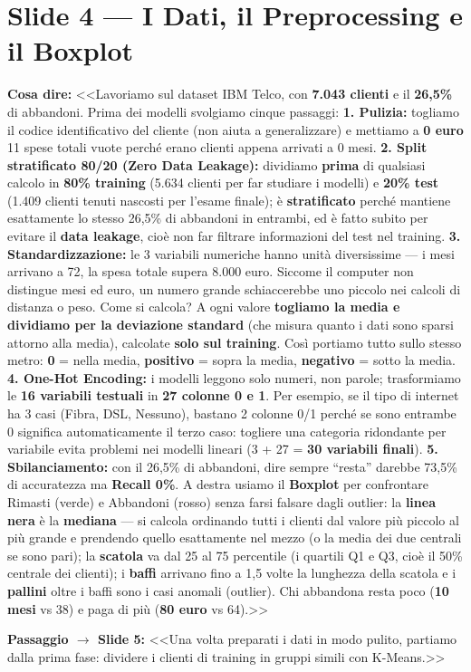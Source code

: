 \documentclass[10pt, a4paper]{article}
\newcommand{\say}[1]{%
  \par\vspace{2pt}\noindent\colorbox{SoftBox}{\parbox{\dimexpr\linewidth-2\fboxsep}{\raggedright\small\textbf{\color{PrimaryNavy}Cosa dire:} #1}}\par\vspace{2pt}%
}
\newcommand{\pass}[2]{%
  \par\vspace{1pt}\noindent\colorbox{PassBox}{\parbox{\dimexpr\linewidth-2\fboxsep}{\raggedright\footnotesize\textbf{\color{AccentAmber}Passaggio $\rightarrow$ Slide #1:} <<#2>>}}\par%
}
\newcommand{\slideblock}[3]{%
  \noindent\begin{minipage}{\linewidth}
    \section*{#1}
    \say{#2}
    #3
  \end{minipage}\par\vspace{6pt}%
}
\begin{document}
\slideblock{Slide 4 --- I Dati, il Preprocessing e il Boxplot}{%
<<Lavoriamo sul dataset IBM Telco, con \textbf{7.043 clienti} e il \textbf{26,5\%} di abbandoni. Prima dei modelli svolgiamo cinque passaggi:
\textbf{1. Pulizia:} togliamo il codice identificativo del cliente (non aiuta a generalizzare) e mettiamo a \textbf{0 euro} 11 spese totali vuote perché erano clienti appena arrivati a 0 mesi.
\textbf{2. Split stratificato 80/20 (Zero Data Leakage):} dividiamo \textbf{prima} di qualsiasi calcolo in \textbf{80\% training} (5.634 clienti per far studiare i modelli) e \textbf{20\% test} (1.409 clienti tenuti nascosti per l'esame finale); è \textbf{stratificato} perché mantiene esattamente lo stesso 26,5\% di abbandoni in entrambi, ed è fatto subito per evitare il \textbf{data leakage}, cioè non far filtrare informazioni del test nel training.
\textbf{3. Standardizzazione:} le 3 variabili numeriche hanno unità diversissime --- i mesi arrivano a 72, la spesa totale supera 8.000 euro. Siccome il computer non distingue mesi ed euro, un numero grande schiaccerebbe uno piccolo nei calcoli di distanza o peso. Come si calcola? A ogni valore \textbf{togliamo la media e dividiamo per la deviazione standard} (che misura quanto i dati sono sparsi attorno alla media), calcolate \textbf{solo sul training}. Così portiamo tutto sullo stesso metro: \textbf{0} = nella media, \textbf{positivo} = sopra la media, \textbf{negativo} = sotto la media.
\textbf{4. One-Hot Encoding:} i modelli leggono solo numeri, non parole; trasformiamo le \textbf{16 variabili testuali} in \textbf{27 colonne 0 e 1}. Per esempio, se il tipo di internet ha 3 casi (Fibra, DSL, Nessuno), bastano 2 colonne 0/1 perché se sono entrambe 0 significa automaticamente il terzo caso: togliere una categoria ridondante per variabile evita problemi nei modelli lineari (3 + 27 = \textbf{30 variabili finali}).
\textbf{5. Sbilanciamento:} con il 26,5\% di abbandoni, dire sempre ``resta'' darebbe 73,5\% di accuratezza ma \textbf{Recall 0\%}.
A destra usiamo il \textbf{Boxplot} per confrontare Rimasti (verde) e Abbandoni (rosso) senza farsi falsare dagli outlier: la \textbf{linea nera} è la \textbf{mediana} --- si calcola ordinando tutti i clienti dal valore più piccolo al più grande e prendendo quello esattamente nel mezzo (o la media dei due centrali se sono pari); la \textbf{scatola} va dal 25\textdegree{} al 75\textdegree{} percentile (i quartili Q1 e Q3, cioè il 50\% centrale dei clienti); i \textbf{baffi} arrivano fino a 1,5 volte la lunghezza della scatola e i \textbf{pallini} oltre i baffi sono i casi anomali (outlier). Chi abbandona resta poco (\textbf{10 mesi} vs 38) e paga di più (\textbf{80 euro} vs 64).>>%
}{\pass{5}{Una volta preparati i dati in modo pulito, partiamo dalla prima fase: dividere i clienti di training in gruppi simili con K-Means.}}
\end{document}
